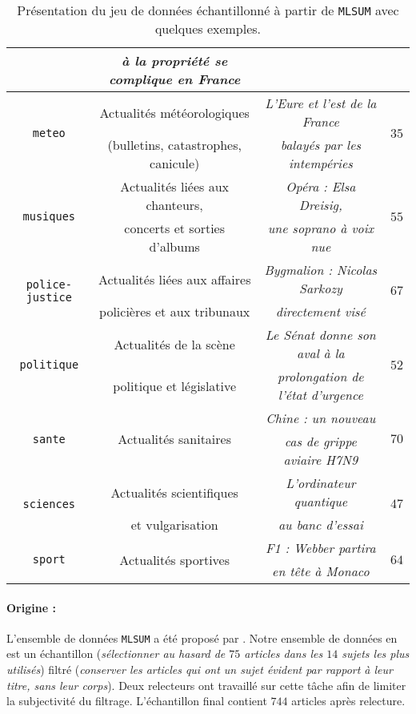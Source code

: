 \begin{table}[!htb]
\begin{center}
\begin{scriptsize}
\begin{tabular}{|c|c|c|c|}
					& \textit{à la propriété se complique en France}
					&
					\tabularnewline
					\hline
				\multirow{2}{*}{\texttt{meteo}}
					& Actualités météorologiques
					& \textit{L’Eure et l’est de la France}
					& \multirow{2}{*}{$35$}
					\tabularnewline
					& (bulletins, catastrophes, canicule)
					& \textit{balayés par les intempéries}
					&
					\tabularnewline
					\hline
				\multirow{2}{*}{\texttt{musiques}}
					& Actualités liées aux chanteurs,
					& \textit{Opéra : Elsa Dreisig,}
					& \multirow{2}{*}{$55$}
					\tabularnewline
					& concerts et sorties d'albums
					& \textit{une soprano à voix nue}
					&
					\tabularnewline
					\hline
				\multirow{2}{*}{\texttt{police-justice}}
					&Actualités liées aux affaires
					& \textit{Bygmalion : Nicolas Sarkozy}
					& \multirow{2}{*}{$67$}
					\tabularnewline
					& policières et aux tribunaux
					& \textit{directement visé}
					&
					\tabularnewline
					\hline
				\multirow{2}{*}{\texttt{politique}}
					& Actualités de la scène
					& \textit{Le Sénat donne son aval à la}
					& \multirow{2}{*}{$52$}
					\tabularnewline
					& politique et législative
					& \textit{prolongation de l’état d’urgence}
					&
					\tabularnewline
					\hline
				\multirow{2}{*}{\texttt{sante}}
					& \multirow{2}{*}{Actualités sanitaires}
					& \textit{Chine : un nouveau}
					& \multirow{2}{*}{$70$}
					\tabularnewline
					&
					& \textit{cas de grippe aviaire H7N9}
					&
					\tabularnewline
					\hline
				\multirow{2}{*}{\texttt{sciences}}
					& Actualités scientifiques
					& \textit{L'ordinateur quantique}
					& \multirow{2}{*}{$47$}
					\tabularnewline
					& et vulgarisation
					& \textit{au banc d’essai}
					&
					\tabularnewline
					\hline
				\multirow{2}{*}{\texttt{sport}}
					& \multirow{2}{*}{Actualités sportives}
					& \textit{F1 : Webber partira}
					& \multirow{2}{*}{$64$}
					\tabularnewline
					&
					& \textit{en tête à Monaco}
					&
					\tabularnewline
					\hline
			\end{tabular}
			\end{scriptsize}
			\end{center}
			\caption{
				Présentation du jeu de données échantillonné à partir de \texttt{MLSUM} avec quelques exemples.
			}
			\label{table:A.2-DATASET-MLSUM-SUBSET-SCHILD}
		\end{table}
		
		\paragraph{Origine :}
		L'ensemble de données \texttt{MLSUM} a été proposé par \cite{scialom-etal:2020:mlsum-multilingual-summarization}.
		Notre ensemble de données en est un échantillon (\textit{sélectionner au hasard de $75$ articles dans les $14$ sujets les plus utilisés}) filtré (\textit{conserver les articles qui ont un sujet évident par rapport à leur titre, sans leur corps}).
		Deux relecteurs ont travaillé sur cette tâche afin de limiter la subjectivité du filtrage.
		L'échantillon final contient $744$ articles après relecture.
		
